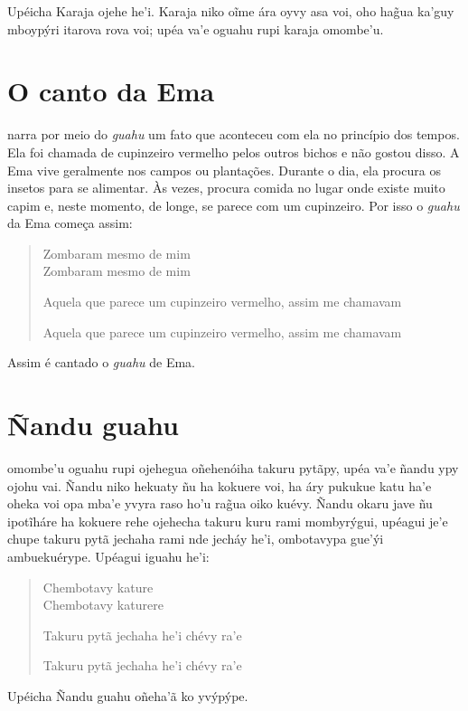 Upéicha Karaja ojehe he'i. Karaja niko oĩme ára oyvy asa voi, oho hag̃ua
ka'guy mboypýri itarova rova voi; upéa va'e oguahu rupi karaja omombe'u.

\chapter{O canto da Ema}

 narra por meio do \textit{guahu} um fato que aconteceu com ela no
princípio dos tempos. Ela foi chamada de cupinzeiro vermelho pelos
outros bichos e não gostou disso. A Ema vive geralmente nos campos ou
plantações. Durante o dia, ela procura os insetos para se alimentar. Às
vezes, procura comida no lugar onde existe muito capim e, neste momento,
de longe, se parece com um cupinzeiro. Por isso o \textit{guahu} da Ema
começa assim:

\begin{verse}
Zombaram mesmo de mim\\
Zombaram mesmo de mim

Aquela que parece um cupinzeiro vermelho, assim me chamavam

Aquela que parece um cupinzeiro vermelho, assim me chamavam
\end{verse}

Assim é cantado o \textit{guahu} de Ema.

\chapter{Ñandu guahu}

 omombe'u oguahu rupi ojehegua oñehenóiha takuru pytãpy, upéa va'e
ñandu ypy ojohu vai. Ñandu niko hekuaty ñu ha kokuere voi, ha áry
pukukue katu ha'e oheka voi opa mba'e yvyra raso ho'u rag̃ua oiko kuévy.
Ñandu okaru jave ñu ipotĩháre ha kokuere rehe ojehecha takuru kuru rami
mombyrýgui, upéagui je'e chupe takuru pytã jechaha rami nde jecháy he'i,
ombotavypa gue'ýi ambuekuérype. Upéagui iguahu he'i:

\begin{verse}
Chembotavy kature\\
Chembotavy katurere

Takuru pytã jechaha he'i chévy ra'e

Takuru pytã jechaha he'i chévy ra'e
\end{verse}



Upéicha Ñandu guahu oñeha'ã ko yvýpýpe.


